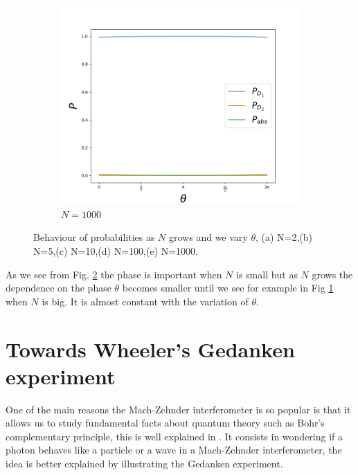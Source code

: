 \documentclass{book}
\begin{document}
\begin{figure}[H]
\begin{subfigure}[b]{0.30\linewidth}
\includegraphics[width=\linewidth]{images/Azuma_phases1000.png}
\caption{$N=1000$ }
\label{1000}
\end{subfigure}
\caption{Behaviour of probabilities as $N$ grows and we vary $\theta$, (a) N=2,(b) N=5,(c) N=10,(d) N=100,(e) N=1000.}
\label{con_fase}
\end{figure}

As we see from Fig. \ref{con_fase} the phase is important when $N$ is small but as $N$  grows the dependence on the phase $\theta$ becomes smaller until we see for example in Fig \ref{1000} when $N$ is big. It is almost constant with the variation of $\theta$.


\section{Towards Wheeler's Gedanken experiment}

One of the main reasons the Mach-Zehnder interferometer is so popular is that it allows us to study fundamental facts about quantum theory such as Bohr's complementary principle, this is well explained in \cite{delayed}. It consists in wondering if a photon behaves like a particle or a wave in a Mach-Zehnder interferometer, the idea is better explained by illustrating the Gedanken experiment.
\end{document}
